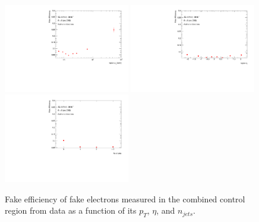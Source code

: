 \begin{figure}[htb]
        \begin{center}
        \includegraphics[width = 0.49\textwidth]{figures/Analysis/Background/Fake_Eff_Elec_pt_1D.pdf}
        \includegraphics[width = 0.49\textwidth]{figures/Analysis/Background/Fake_Eff_Elec_eta_1D.pdf}\\
        \includegraphics[width = 0.49\textwidth]{figures/Analysis/Background/Fake_Eff_Elec_jet_n_1D.pdf} 
        \end{center}
    \caption{Fake efficiency of fake electrons measured in the combined control region from data as a function of its $p_{T}$, $\eta$, and $n_{jets}$.\label{fig:FakeEff_1D_Electron}}
\end{figure}

